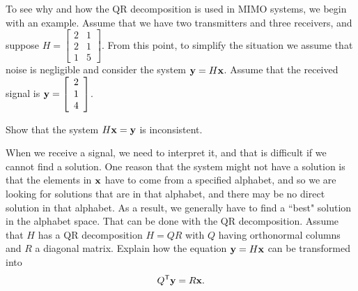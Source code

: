 \begin{pactivity} \label{act:QR_example_1} To see why and how the QR decomposition is used in MIMO systems, we begin with an example. Assume that we have two transmitters and three receivers, and suppose $H = \left[ \begin{array}{cc} 2&1\\2&1\\1&5 \end{array} \right]$. From this point, to simplify the situation we assume that noise is negligible and consider the system $\mathbf{y} = H\mathbf{x}$. Assume that the received signal is $\mathbf{y} = \left[ \begin{array}{c} 2\\1\\4 \end{array} \right]$. 
\ba
\item Show that the system $H \mathbf{x} = \mathbf{y}$ is inconsistent.

\begin{comment}

\solution The reduced row echelon form of $[H | \vy] = \left[ \begin{array}{ccc} 2&1&2\\2&1&1\\1&5&4 \end{array} \right]$ is $I_3$, so the augmented column is a pivot column.

\end{comment}

\item When we receive a signal, we need to interpret it, and that is difficult if we cannot find a solution. One reason that the system might not have a solution is that the elements in $\mathbf{x}$ have to come from a specified alphabet, and so we are looking for solutions that are in that alphabet, and there may be no direct solution in that alphabet. As a result, we generally have to find a ``best" solution in the alphabet space. That can be done with the QR decomposition. Assume that $H$ has a QR decomposition $H = QR$ with $Q$ having orthonormal columns and $R$ a diagonal matrix. Explain how the equation $\mathbf{y} = H\mathbf{x}$ can be transformed into  
\begin{equation} \label{eq:QR_system_example}
Q^{\mathsf{T}} \mathbf{y} = R\mathbf{x}.
\end{equation} 

\begin{comment}

\solution Since the columns of $Q$ are orthonormal, $Q^{\tr}Q = I_k$. Multiplying both sides of $\vy = QR\vx$ by $Q^{\tr}$ yields  
\[Q^{\tr} \vy = Q^{\tr}QR\vx  = R\vx.\]


\end{comment}
\end{pactivity}
